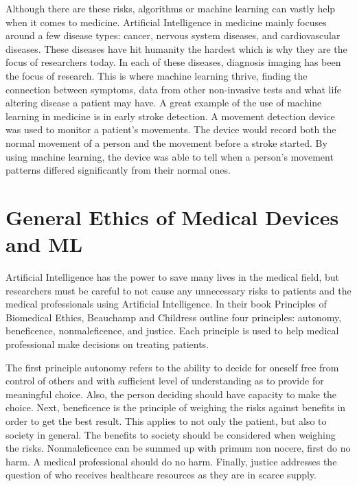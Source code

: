 \documentclass[]{article}
\begin{document}
			Although there are these risks, algorithms or machine learning can vastly help when it comes to medicine. Artificial Intelligence in medicine mainly focuses around a few disease types: cancer, nervous system diseases, and cardiovascular diseases. These diseases have hit humanity the hardest which is why they are the focus of researchers today. In each of these diseases, diagnosis imaging has been the focus of research. This is where machine learning thrive, finding the connection between symptoms, data from other non-invasive tests and what life altering disease a patient may have. A great example of the use of machine learning in medicine is in early stroke detection. A movement detection device was used to monitor a patient’s movements. The device would record both the normal movement of a person and the movement before a stroke started. By using machine learning, the device was able to tell when a person’s movement patterns differed significantly from their normal ones.\cite{Jiang230}
		
	\section{General Ethics of Medical Devices and ML}\label{ethics}

		Artificial Intelligence has the power to save many lives in the medical field, but researchers must be careful to not cause any unnecessary risks to patients and the medical professionals using Artificial Intelligence. In their book Principles of Biomedical Ethics, Beauchamp and Childress outline four principles: autonomy, beneficence, nonmaleficence, and justice. Each principle is used to help medical professional make decisions on treating patients.

		The first principle autonomy refers to the ability to decide for oneself free from control of others and with sufficient level of understanding as to provide for meaningful choice. Also, the person deciding should have capacity to make the choice. Next, beneficence is the principle of weighing the risks against benefits in order to get the best result. This applies to not only the patient, but also to society in general. The benefits to society should be considered when weighing the risks. Nonmaleficence can be summed up with primum non nocere, first do no harm. A medical professional should do no harm. Finally, justice addresses the question of who receives healthcare resources as they are in scarce supply.\cite{lawrence2007four}
\end{document}
